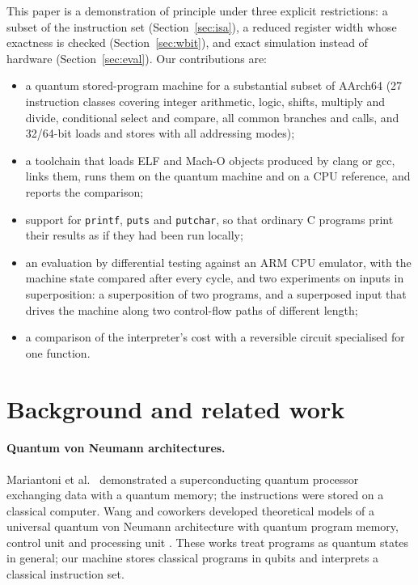 \documentclass[11pt]{article}
\begin{document}
This paper is a demonstration of principle under three explicit restrictions: a subset of the
instruction set (Section~\ref{sec:isa}), a reduced register width whose exactness is checked
(Section~\ref{sec:wbit}), and exact simulation instead of hardware (Section~\ref{sec:eval}).
Our contributions are:
\begin{itemize}
  \item a quantum stored-program machine for a substantial subset of AArch64 (27 instruction
        classes covering integer arithmetic, logic, shifts, multiply and divide, conditional
        select and compare, all common branches and calls, and 32/64-bit loads and stores with
        all addressing modes);
  \item a toolchain that loads ELF and Mach-O objects produced by clang or gcc, links them,
        runs them on the quantum machine and on a CPU reference, and reports the comparison;
  \item support for \texttt{printf}, \texttt{puts} and \texttt{putchar}, so that ordinary
        C programs print their results as if they had been run locally;
  \item an evaluation by differential testing against an ARM CPU emulator, with the machine
        state compared after every cycle, and two experiments on inputs in superposition:
        a superposition of two programs, and a superposed input that drives the machine along
        two control-flow paths of different length;
  \item a comparison of the interpreter's cost with a reversible circuit specialised for one
        function.
\end{itemize}

\section{Background and related work}

\paragraph{Quantum von Neumann architectures.}
Mariantoni et al.~\cite{mariantoni2011} demonstrated a superconducting quantum processor
exchanging data with a quantum memory; the instructions were stored on a classical computer.
Wang and coworkers developed theoretical models of a universal quantum von Neumann
architecture with quantum program memory, control unit and processing unit
\cite{wang2022prototype,liu2023survey,wang2024family}. These works treat programs as quantum
states in general; our machine stores classical programs in qubits and interprets a
classical instruction set.
\end{document}
